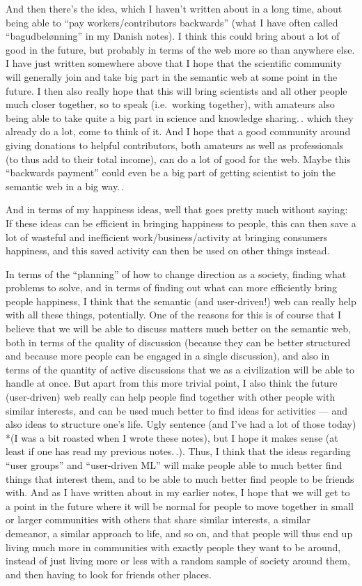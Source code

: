 \documentclass{report}
\begin{document}
And then there's the idea, which I haven't written about in a long time, about being able to ``pay workers/contributors backwards'' (what I have often called ``bagudbelønning'' in my Danish notes). I think this could bring about a lot of good in the future, but probably in terms of the web more so than anywhere else. I have just written somewhere above that I hope that the scientific community will generally join and take big part in the semantic web at some point in the future. I then also really hope that this will bring scientists and all other people much closer together, so to speak (i.e.\ working together), with amateurs also being able to take quite a big part in science and knowledge sharing.\,. which they already do a lot, come to think of it. And I hope that a good community around giving donations to helpful contributors, both amateurs as well as professionals (to thus add to their total income), can do a lot of good for the web. Maybe this ``backwards payment'' could even be a big part of getting scientist to join the semantic web in a big way.\,.

And in terms of my happiness ideas, well that goes pretty much without saying: If these ideas can be efficient in bringing happiness to people, this can then save a lot of wasteful and inefficient work/business/activity at bringing consumers happiness, and this saved activity can then be used on other things instead. 

In terms of the ``planning'' of how to change direction as a society, finding what problems to solve, and in terms of finding out what can more efficiently bring people happiness, I think that the semantic (and user-driven!) web can really help with all these things, potentially. One of the reasons for this is of course that I believe that we will be able to discuss matters much better on the semantic web, both in terms of the quality of discussion (because they can be better structured and because more people can be engaged in a single discussion), and also in terms of the quantity of active discussions that we as a civilization will be able to handle at once. But apart from this more trivial point, I also think the future (user-driven) web really can help people find together with other people with similar interests, and can be used much better to find ideas for activities --- and also ideas to structure one's life. Ugly sentence (and I've had a lot of those today) *(I was a bit roasted when I wrote these notes), but I hope it makes sense (at least if one has read my previous notes.\,.). Thus, I think that the ideas regarding ``user groups'' and ``user-driven ML'' will make people able to much better find things that interest them, and to be able to much better find people to be friends with. And as I have written about in my earlier notes, I hope that we will get to a point in the future where it will be normal for people to move together in small or larger communities with others that share similar interests, a similar demeanor, a similar approach to life, and so on, and that people will thus end up living much more in communities with exactly people they want to be around, instead of just living more or less with a random sample of society around them, and then having to look for friends other places. 
\end{document}
